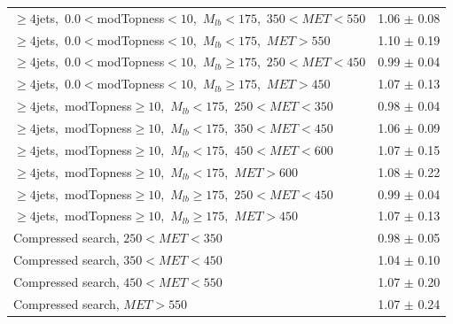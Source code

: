 \begin{table}[htbp]
\begin{tabular}{|l|c|}
$\ge4$jets,~$0.0<$modTopness$<10$,~$M_{lb}<175$,~$350<MET<550$  &  1.06 $\pm$ 0.08 \\
$\ge4$jets,~$0.0<$modTopness$<10$,~$M_{lb}<175$,~$MET>550$      &  1.10 $\pm$ 0.19 \\
\hline
$\ge4$jets,~$0.0<$modTopness$<10$,~$M_{lb}\ge175$,~$250<MET<450$&  0.99 $\pm$ 0.04 \\
$\ge4$jets,~$0.0<$modTopness$<10$,~$M_{lb}\ge175$,~$MET>450$    &  1.07 $\pm$ 0.13 \\
\hline
$\ge4$jets,~modTopness$\ge10$,~$M_{lb}<175$,~$250<MET<350$      &  0.98 $\pm$ 0.04 \\
$\ge4$jets,~modTopness$\ge10$,~$M_{lb}<175$,~$350<MET<450$      &  1.06 $\pm$ 0.09 \\
$\ge4$jets,~modTopness$\ge10$,~$M_{lb}<175$,~$450<MET<600$      &  1.07 $\pm$ 0.15 \\
$\ge4$jets,~modTopness$\ge10$,~$M_{lb}<175$,~$MET>600$          &  1.08 $\pm$ 0.22 \\
\hline
$\ge4$jets,~modTopness$\ge10$,~$M_{lb}\ge175$,~$250<MET<450$    &  0.99 $\pm$ 0.04 \\
$\ge4$jets,~modTopness$\ge10$,~$M_{lb}\ge175$,~$MET>450$        &  1.07 $\pm$ 0.13 \\
\hline
Compressed search, $250<MET<350$                               &  0.98 $\pm$ 0.05 \\
Compressed search, $350<MET<450$                               &  1.04 $\pm$ 0.10 \\
Compressed search, $450<MET<550$                               &  1.07 $\pm$ 0.20 \\
Compressed search, $MET>550$                                   &  1.07 $\pm$ 0.24 \\
\hline
\end{tabular}
\end{table}
